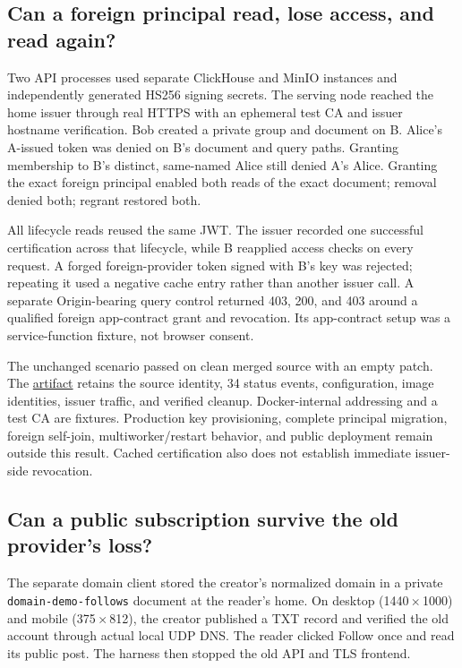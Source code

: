 \documentclass[sigconf, nonacm]{acmart}
\newcommand{\artifactbase}{https://github.com/jacoby149/web10}
\newcommand{\domainartifactrev}{26720acba859c7eb03fc5d26a6221cdde5b764a1}
\newcommand{\evidence}[2]{\href{\artifactbase/tree/\domainartifactrev/#1}{#2}}
\begin{document}
\subsection{Can a foreign principal read, lose access, and read again?}
\label{sec:ev-network}

Two API processes used separate ClickHouse and MinIO instances and
independently generated HS256 signing secrets. The serving node reached
the home issuer through real HTTPS with an ephemeral test CA and issuer
hostname verification. Bob created a private group and document on B.
Alice's A-issued token was denied on B's document and query paths.
Granting membership to B's distinct, same-named Alice still denied
A's Alice. Granting the exact foreign principal enabled both reads of
the exact document; removal denied both; regrant restored both.

All lifecycle reads reused the same JWT. The issuer recorded one
successful certification across that lifecycle, while B reapplied access
checks on every request. A forged foreign-provider token signed with
B's key was rejected; repeating it used a negative cache entry rather
than another issuer call. A separate Origin-bearing query control
returned 403, 200, and 403 around a qualified foreign app-contract grant
and revocation. Its app-contract setup was a service-function fixture,
not browser consent.

The unchanged scenario passed on clean merged source with an empty
patch. The \evidence{research/federation-demo}{artifact} retains the
source identity, 34 status events, configuration, image identities,
issuer traffic, and verified cleanup. Docker-internal addressing and a
test CA are fixtures. Production key provisioning, complete principal
migration, foreign self-join, multiworker/restart behavior, and public
deployment remain outside this result. Cached certification also does
not establish immediate issuer-side revocation.

\subsection{Can a public subscription survive the old provider's loss?}
\label{sec:ev-domain}

The separate domain client stored the creator's normalized domain in a
private \texttt{domain-demo-follows} document at the reader's home.
On desktop (1440\,$\times$\,1000) and mobile (375\,$\times$\,812), the
creator published a TXT record and verified the old account through
actual local UDP DNS. The reader clicked Follow once and read its
public post. The harness then stopped the old API and TLS frontend.
\end{document}
